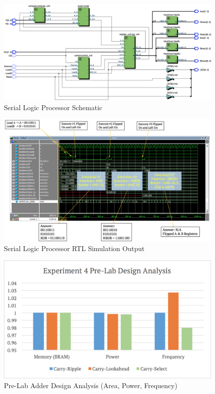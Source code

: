 \documentclass[journal, twocolumn, final,11pt,letterpaper]{IEEEtran}
\begin{document}
\begin{figure} [htbp]
	\centering
	\includegraphics[scale=0.35]{Schematic-Processor.png}
	\caption{Serial Logic Processor Schematic\label{fig:schematic-processor}}
\end{figure}

\begin{figure} [htbp]
	\centering
	\includegraphics[scale=0.55]{processor-output-rtl-simulator.png}
	\caption{Serial Logic Processor RTL Simulation Output\label{fig:processor-output-rtl-simulator}}
\end{figure}

\begin{figure} [htbp]
	\centering
	\includegraphics[scale=0.55]{pre-lab-design-analysis.png}
	\caption{Pre-Lab Adder Design Analysis (Area, Power, Frequency)\label{fig:pre-lab-design-analysis}}
\end{figure}



\end{document}
